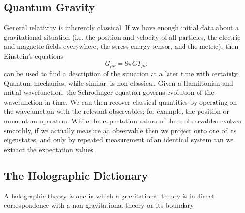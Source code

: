 \documentclass[12pt,a4paper]{report}
\numberwithin{equation}{section}
\theoremstyle{definition}
\theoremstyle{theorem}
\theoremstyle{theorem}
\theoremstyle{example}
\theoremstyle{definition}
\begin{document}
\subsection{Quantum Gravity}
General relativity is inherently classical. If we have enough initial data about a gravitational situation (i.e. the position and velocity of all particles, the electric and magnetic fields everywhere, the stress-energy tensor, and the metric), then Einstein's equations
\begin{equation}
	G_{\mu\nu}=8\pi G T_{\mu\nu}
\end{equation}
can be used to find a description of the situation at a later time with certainty.\\
Quantum mechanics, while similar, is non-classical. Given a Hamiltonian and initial wavefunction, the Schrodinger equation governs evolution of the wavefunction in time. We can then recover classical quantities by operating on the wavefunction with the relevant observables; for example, the position or momentum operators. While the expectation values of these observables evolves smoothly, if we actually measure an observable then we project onto one of its eigenstates, and only by repeated measurement of an identical system can we extract the expectation values.\\
\subsection{The Holographic Dictionary}
A holographic theory is one in which a gravitational theory is in direct correspondence with a non-gravitational theory on its boundary
\end{document}
